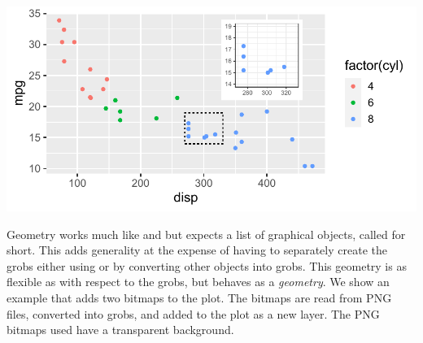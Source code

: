 \documentclass[krantz2]{krantz}\usepackage{knitr}
\begin{document}
\begin{knitrout}
{\centering \includegraphics[width=.7\textwidth]{figure/pos-plot-plot-03-1}

}



\end{knitrout}
Geometry  works much like  and  but expects a list of  graphical objects, called  for short. This adds generality at the expense of having to separately create the grobs either using  or by converting other objects into grobs. This geometry is as flexible as  with respect to the grobs, but behaves as a \emph{geometry}. We show an example that adds two bitmaps to the plot. The bitmaps are read from PNG files, converted into grobs, and added to the plot as a new layer. The PNG bitmaps used have a transparent background.
\end{document}
